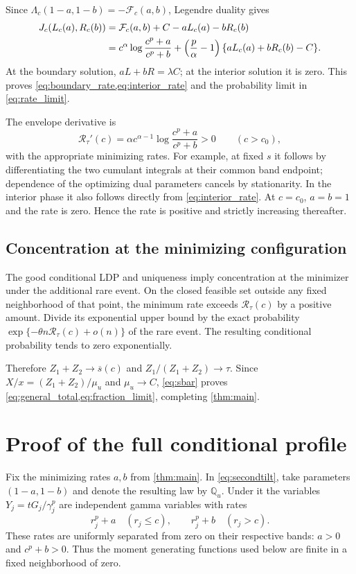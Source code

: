 \documentclass[11pt,letterpaper]{article}
\numberwithin{equation}{section}
\theoremstyle{definition}
\theoremstyle{remark}
\newcommand{\QQ}{\mathbb Q}
\newcommand{\rate}{\mathcal R_\tau}
\begin{document}
Since $\Lambda_c(1-a,1-b)=-\mathcal F_c(a,b)$, Legendre duality gives
\begin{align}\label{eq:J_eval}
 J_c(L_c(a),R_c(b))
 &=\mathcal F_c(a,b)+C-aL_c(a)-bR_c(b)\notag\\
 &=c^\alpha\log\frac{c^p+a}{c^p+b}
 +\left(\frac p\alpha-1\right)
 \{aL_c(a)+bR_c(b)-C\}.
\end{align}
At the boundary solution, $aL+bR=\lambda C$; at the interior solution it is zero. This proves \cref{eq:boundary_rate,eq:interior_rate} and the probability limit in \cref{eq:rate_limit}.

The envelope derivative is
\begin{equation}\label{eq:rate_derivative}
 \rate'(c)=\alpha c^{\alpha-1}\log\frac{c^p+a}{c^p+b}>0
 \qquad(c>c_0),
\end{equation}
with the appropriate minimizing rates. For example, at fixed $s$ it follows by differentiating the two cumulant integrals at their common band endpoint; dependence of the optimizing dual parameters cancels by stationarity. In the interior phase it also follows directly from \cref{eq:interior_rate}. At $c=c_0$, $a=b=1$ and the rate is zero. Hence the rate is positive and strictly increasing thereafter.

\subsection{Concentration at the minimizing configuration}

The good conditional LDP and uniqueness imply concentration at the minimizer under the additional rare event. On the closed feasible set outside any fixed neighborhood of that point, the minimum rate exceeds $\rate(c)$ by a positive amount. Divide its exponential upper bound by the exact probability $\exp\{-\theta n\rate(c)+o(n)\}$ of the rare event. The resulting conditional probability tends to zero exponentially.

Therefore $Z_1+Z_2\to\overline s(c)$ and $Z_1/(Z_1+Z_2)\to\tau$. Since $X/x=(Z_1+Z_2)/\mu_u$ and $\mu_u\to C$, \cref{eq:sbar} proves \cref{eq:general_total,eq:fraction_limit}, completing \cref{thm:main}.

\section{Proof of the full conditional profile}\label{sec:profileproof}

Fix the minimizing rates $a,b$ from \cref{thm:main}. In \cref{eq:secondtilt}, take parameters $(1-a,1-b)$ and denote the resulting law by $\QQ_u$. Under it the variables $Y_j=tG_j/\gamma_j^p$ are independent gamma variables with rates
\begin{equation}\label{eq:profile_rates}
 r_j^p+a\quad(r_j\le c),\qquad
 r_j^p+b\quad(r_j>c).
\end{equation}
These rates are uniformly separated from zero on their respective bands: $a>0$ and $c^p+b>0$. Thus the moment generating functions used below are finite in a fixed neighborhood of zero.
\end{document}
